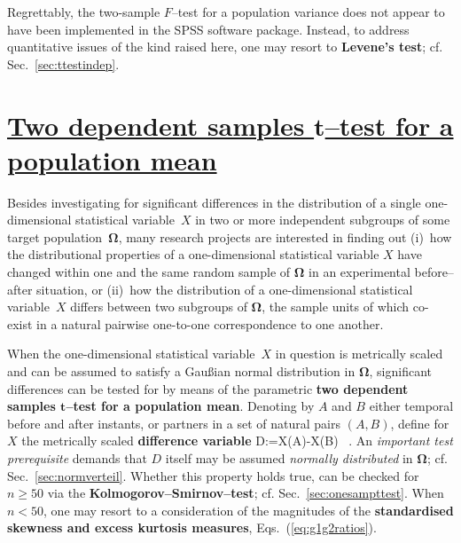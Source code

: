 \medskip
\noindent
Regrettably, the two-sample $F$--test for a population 
variance does not appear to have been implemented in the SPSS 
software package. Instead, to address quantitative issues of the 
kind raised here, one may resort to \textbf{Levene's test}; cf. 
Sec.~\ref{sec:ttestindep}.

\section[Dependent samples $t$--test for a mean]{\href{https://www.youtube.com/watch?v=XqaTOsBSvg0}{Two dependent samples $\boldsymbol{t}$--test
for a population mean}}
Besides investigating for significant differences in the 
distribution of a single one-dimensional statistical variable~$X$ 
in two or more independent subgroups of some target 
population~$\boldsymbol{\Omega}$, many research projects are 
interested in finding out (i)~how the distributional properties of 
a one-dimensional statistical variable $X$ have changed within one 
and the same random sample of $\boldsymbol{\Omega}$ in an 
experimental before--after situation, or (ii)~how the distribution 
of a one-dimensional statistical variable~$X$ differs between two 
subgroups of $\boldsymbol{\Omega}$, the sample units of which 
co-exist in a natural pairwise one-to-one correspondence to one 
another.

\medskip
\noindent
When the one-dimensional statistical variable~$X$ in question is 
metrically scaled and can be assumed to satisfy a Gau\ss ian 
normal distribution in $\boldsymbol{\Omega}$, significant 
differences can be tested for by means of the parametric
\textbf{two dependent samples $\boldsymbol{t}$--test for a
population mean}. Denoting by $A$ and $B$ either temporal before
and after instants, or partners in a set of natural pairs $(A,B)$,
define for $X$ the metrically scaled \textbf{difference variable}
%
\be
D:=X(A)-X(B) \ .
\ee
%
An \textit{important test prerequisite} demands that $D$ itself may 
be assumed \textit{normally distributed} in $\boldsymbol{\Omega}$; 
cf. Sec.~\ref{sec:normverteil}. Whether this property holds true, 
can be checked for $n \geq 50$ via the
\textbf{Kolmogorov--Smirnov--test}; cf.
Sec.~\ref{sec:onesampttest}. When $n < 50$, one may resort to a
consideration of the magnitudes of the \textbf{standardised
skewness and excess kurtosis measures}, Eqs.~(\ref{eq:g1g2ratios}). 

